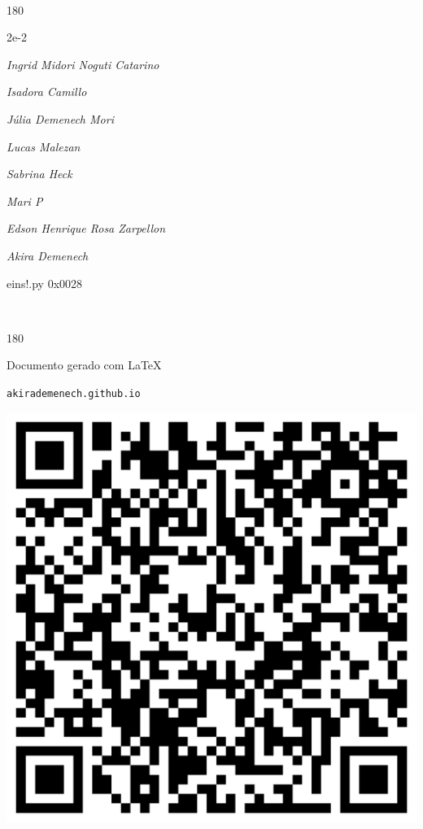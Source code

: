 \documentclass[12pt]{article}
\begin{document}
\pagebreak			

	\ 
	\vfill
	\begin{turn}{180}	
		\begin{minipage}{\textwidth}
		  	\ttfamily %
			\centering
			{\Huge 2e-2}
		  
			\hfill
		  
			

\textit{\small Ingrid Midori Noguti Catarino}

\textit{\small Isadora Camillo}

\textit{\small Júlia Demenech Mori}

\textit{\small Lucas Malezan}

\textit{\small Sabrina Heck}

\textit{\small Mari P}

\textit{\small Edson Henrique Rosa Zarpellon}

\textit{\small Akira Demenech}

\bigskip

eins!.py
0x0028


		\end{minipage}	
	\end{turn}
	\vfill
	\

\pagebreak

	\begin{turn}{180}	
		\begin{minipage}{\textwidth}		  
		  Documento gerado com \LaTeX			
		  
		  \texttt{akirademenech.github.io}

		  \includegraphics[height=0.3\textheight]{2e-2.pdf}

		\end{minipage}	
	\end{turn}  
		  
\end{document}
